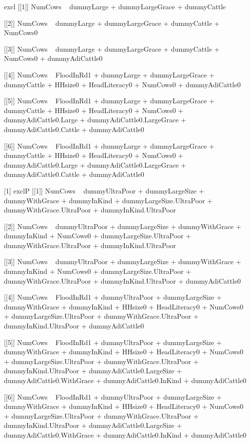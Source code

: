 \begin{Schunk}
\begin{Soutput}
[1] excl
[[1]]
NumCows ~ dummyLarge + dummyLargeGrace + dummyCattle

[[2]]
NumCows ~ dummyLarge + dummyLargeGrace + dummyCattle + NumCows0

[[3]]
NumCows ~ dummyLarge + dummyLargeGrace + dummyCattle + NumCows0 + 
    dummyAdiCattle0

[[4]]
NumCows ~ FloodInRd1 + dummyLarge + dummyLargeGrace + dummyCattle + 
    HHsize0 + HeadLiteracy0 + NumCows0 + dummyAdiCattle0

[[5]]
NumCows ~ FloodInRd1 + dummyLarge + dummyLargeGrace + dummyCattle + 
    HHsize0 + HeadLiteracy0 + NumCows0 + dummyAdiCattle0.Large + 
    dummyAdiCattle0.LargeGrace + dummyAdiCattle0.Cattle + dummyAdiCattle0

[[6]]
NumCows ~ FloodInRd1 + dummyLarge + dummyLargeGrace + dummyCattle + 
    HHsize0 + HeadLiteracy0 + NumCows0 + dummyAdiCattle0.Large + 
    dummyAdiCattle0.LargeGrace + dummyAdiCattle0.Cattle + dummyAdiCattle0

[1] exclP
[[1]]
NumCows ~ dummyUltraPoor + dummyLargeSize + dummyWithGrace + 
    dummyInKind + dummyLargeSize.UltraPoor + dummyWithGrace.UltraPoor + 
    dummyInKind.UltraPoor

[[2]]
NumCows ~ dummyUltraPoor + dummyLargeSize + dummyWithGrace + 
    dummyInKind + NumCows0 + dummyLargeSize.UltraPoor + dummyWithGrace.UltraPoor + 
    dummyInKind.UltraPoor

[[3]]
NumCows ~ dummyUltraPoor + dummyLargeSize + dummyWithGrace + 
    dummyInKind + NumCows0 + dummyLargeSize.UltraPoor + dummyWithGrace.UltraPoor + 
    dummyInKind.UltraPoor + dummyAdiCattle0

[[4]]
NumCows ~ FloodInRd1 + dummyUltraPoor + dummyLargeSize + dummyWithGrace + 
    dummyInKind + HHsize0 + HeadLiteracy0 + NumCows0 + dummyLargeSize.UltraPoor + 
    dummyWithGrace.UltraPoor + dummyInKind.UltraPoor + dummyAdiCattle0

[[5]]
NumCows ~ FloodInRd1 + dummyUltraPoor + dummyLargeSize + dummyWithGrace + 
    dummyInKind + HHsize0 + HeadLiteracy0 + NumCows0 + dummyLargeSize.UltraPoor + 
    dummyWithGrace.UltraPoor + dummyInKind.UltraPoor + dummyAdiCattle0.LargeSize + 
    dummyAdiCattle0.WithGrace + dummyAdiCattle0.InKind + dummyAdiCattle0

[[6]]
NumCows ~ FloodInRd1 + dummyUltraPoor + dummyLargeSize + dummyWithGrace + 
    dummyInKind + HHsize0 + HeadLiteracy0 + NumCows0 + dummyLargeSize.UltraPoor + 
    dummyWithGrace.UltraPoor + dummyInKind.UltraPoor + dummyAdiCattle0.LargeSize + 
    dummyAdiCattle0.WithGrace + dummyAdiCattle0.InKind + dummyAdiCattle0


\end{Soutput}
\end{Schunk}

